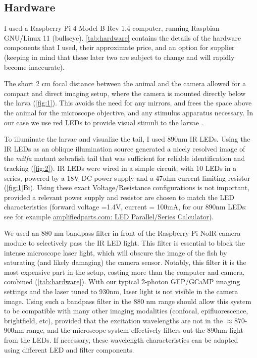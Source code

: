 \documentclass[9pt,lineno]{RandlettLab_elife}
\begin{document}
\subsection{Hardware}

I used a Raspberry Pi 4 Model B Rev 1.4 computer, running Raspbian GNU/Linux 11 (bullseye). \autoref{tab:hardware} contains the details of the hardware components that I used, their approximate price, and an option for supplier (keeping in mind that these later two are subject to change and will rapidly become inaccurate). 

The short 2 cm focal distance between the animal and the camera allowed for a compact and direct imaging setup, where the camera is mounted directly below the larva (\autoref{fig:1}). This avoids the need for any mirrors, and frees the space above the animal for the microscope objective, and any stimulus apparatus necessary. In our case we use red LEDs to provide visual stimuli to the larvae \citep{Lamire2023-di}. 

To illuminate the larvae and visualize the tail, I used 890nm IR LEDs. Using the IR LEDs as an oblique illumination source generated a nicely resolved image of the \textit{mitfa} mutant zebrafish tail that was sufficient for reliable identification and tracking (\autoref{fig:2}). IR LEDs were wired in a simple circuit, with 10 LEDs in a series, powered by a 18V DC power supply and a 47ohm current limiting resistor (\autoref{fig:1}Bi). Using these exact Voltage/Resistance configurations is not important, provided a relevant power supply and resistor are chosen to match the LED characteristics (forward voltage =1.4V, current = 100mA, for our 890nm LEDs: see for example \href{https://www.amplifiedparts.com/tech-articles/led-parallel-series-calculator}{amplifiedparts.com: LED Parallel/Series Calculator}). 

We used an 880 nm bandpass filter in front of the Raspberry Pi NoIR camera module to selectively pass the IR LED light. This filter is essential to block the intense microscope laser light, which will obscure the image of the fish by saturating (and likely damaging) the camera sensor. Notably, this filter it is the most expensive part in the setup, costing more than the computer and camera, combined (\autoref{tab:hardware}). With our typical 2-photon GFP/GCaMP imaging settings and the laser tuned to 930nm, laser light is not visible in the camera image. Using such a bandpass filter in the 880 nm range should allow this system to be compatible with many other imaging modalities (confocal, epifluorescence, brightfield, etc), provided that the excitation wavelengths are not in the $\approx$870-900nm range, and the microscope system effectively filters out the 890nm light from the LEDs. If necessary, these wavelength characteristics can be adapted using different LED and filter components. 
\end{document}
